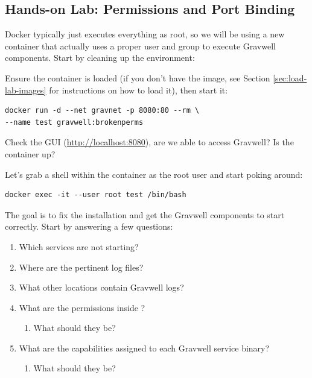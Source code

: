 \subsection{Hands-on Lab: Permissions and Port Binding}

Docker typically just executes everything as root, so we will be using
a new container that actually uses a proper user and group to execute
Gravwell components. Start by cleaning up the environment:


Ensure the  container is loaded (if you don't have the  image, see Section \ref{sec:load-lab-images} for instructions on how to load it), then start it:

\begin{Verbatim}[breaklines=true]
docker run -d --net gravnet -p 8080:80 --rm \
--name test gravwell:brokenperms
\end{Verbatim}

Check the GUI (\href{http://localhost:8080}{http://localhost:8080}), are we able to access Gravwell? Is the container up?

Let's grab a shell within the container as the root user and start
poking around:

\begin{Verbatim}[breaklines=true]
docker exec -it --user root test /bin/bash
\end{Verbatim}

The goal is to fix the installation and get the Gravwell components to
start correctly. Start by answering a few questions:

\begin{enumerate}
\item
  Which services are not starting?
\item
  Where are the pertinent log files?
\item
  What other locations contain Gravwell logs?
\item
  What are the permissions inside ?
	\begin{enumerate}
	\item
	  What should they be?
	\end{enumerate}
\item
  What are the capabilities assigned to each Gravwell service binary?
	\begin{enumerate}
	\item
	  What should they be?
	\end{enumerate}
\end{enumerate}

